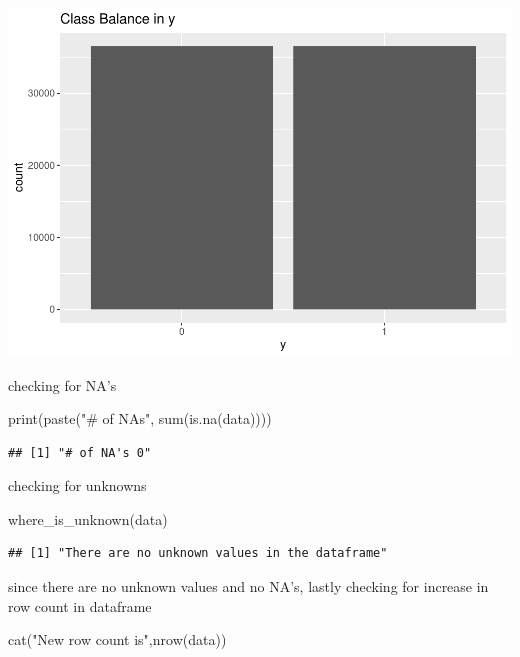 \documentclass[
]{article}
\newenvironment{Shaded}{\begin{snugshade}}{\end{snugshade}}
\newcommand{\FunctionTok}[1]{\textcolor[rgb]{0.00,0.00,0.00}{#1}}
\newcommand{\NormalTok}[1]{#1}
\newcommand{\StringTok}[1]{\textcolor[rgb]{0.31,0.60,0.02}{#1}}
\begin{document}
\includegraphics{part1_files/figure-latex/unnamed-chunk-12-1.pdf}

checking for NA's

\begin{Shaded}
\begin{Highlighting}[]
\FunctionTok{print}\NormalTok{(}\FunctionTok{paste}\NormalTok{(}\StringTok{"\# of NA\textquotesingle{}s"}\NormalTok{, }\FunctionTok{sum}\NormalTok{(}\FunctionTok{is.na}\NormalTok{(data))))}
\end{Highlighting}
\end{Shaded}

\begin{verbatim}
## [1] "# of NA's 0"
\end{verbatim}

checking for unknowns

\begin{Shaded}
\begin{Highlighting}[]
\FunctionTok{where\_is\_unknown}\NormalTok{(data)}
\end{Highlighting}
\end{Shaded}

\begin{verbatim}
## [1] "There are no unknown values in the dataframe"
\end{verbatim}

since there are no unknown values and no NA's, lastly checking for
increase in row count in dataframe

\begin{Shaded}
\begin{Highlighting}[]
\FunctionTok{cat}\NormalTok{(}\StringTok{"New row count is"}\NormalTok{,}\FunctionTok{nrow}\NormalTok{(data))}
\end{Highlighting}
\end{Shaded}
\end{document}
